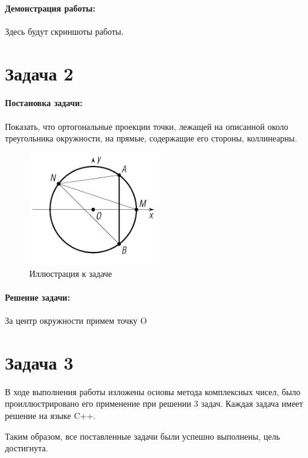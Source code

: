 \paragraph*{Демонстрация работы:}
Здесь будут скриншоты работы.

\section*{Задача 2}
\paragraph{Постановка задачи:} Показать, что ортогональные
проекции точки, лежащей на описанной около
треугольника окружности, на прямые, содержащие его стороны, коллинеарны.
\begin{figure}[ht]
    \centering
    \includegraphics[width=0.5\textwidth]{images/task2.png}
    \caption{Иллюстрация к задаче}
    \label{task2}
\end{figure}
\paragraph{Решение задачи:}
За центр окружности примем точку O

\section*{Задача 3}
В ходе выполнения работы изложены основы метода комплексных чисел, было проиллюстрировано его применение при решении 3 задач. Каждая задача имеет решение на языке C++.


Таким образом, все поставленные задачи были успешно выполнены, цель
достигнута.



